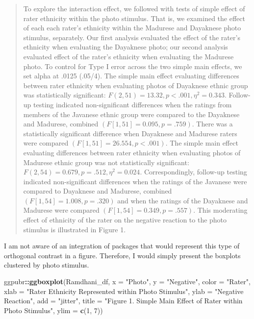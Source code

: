 \documentclass[
  11pt,
]{book}
\newenvironment{Shaded}{\begin{snugshade}}{\end{snugshade}}
\newcommand{\AttributeTok}[1]{\textcolor[rgb]{0.27,0.27,0.27}{#1}}
\newcommand{\DecValTok}[1]{\textcolor[rgb]{0.06,0.06,0.06}{#1}}
\newcommand{\FunctionTok}[1]{\textcolor[rgb]{0.27,0.27,0.27}{\textbf{#1}}}
\newcommand{\NormalTok}[1]{#1}
\newcommand{\SpecialCharTok}[1]{\textcolor[rgb]{0.43,0.43,0.43}{\textbf{#1}}}
\newcommand{\StringTok}[1]{\textcolor[rgb]{0.5,0.5,0.5}{#1}}
\begin{document}
\begin{quote}
To explore the interaction effect, we followed with tests of simple effect of rater ethnicity within the photo stimulus. That is, we examined the effect of each each rater's ethnicity within the Madurese and Dayaknese photo stimulus, separately. Our first analysis evaluated the effect of the rater's ethnicity when evaluating the Dayaknese photo; our second analysis evaluated effect of the rater's ethnicity when evaluating the Madurese photo. To control for Type I error across the two simple main effects, we set alpha at .0125 (.05/4). The simple main effect evaluating differences between rater ethnicity when evaluating photos of Dayaknese ethnic group was statistically significant: \(F(2, 51) = 13.32, p < .001, \eta ^{2} = 0.343\). Follow-up testing indicated non-significant differences when the ratings from members of the Javanese ethnic group were compared to the Dayaknese and Madurese, combined \((F [1, 51] = 0.095, p = .759)\). There was a statistically significant difference when Dayaknese and Madurese raters were compared \((F [1, 51] =26.554, p < .001)\). The simple main effect evaluating differences between rater ethnicity when evaluating photos of Madurese ethnic group was not statistically significant: \(F(2, 54) = 0.679, p = .512, \eta ^{2} = 0.024\). Correspondingly, follow-up testing indicated non-significant differences when the ratings of the Javanese were compared to Dayaknese and Madurese, combined \((F[1, 54] = 1.008, p = .320)\) and when the ratings of the Dayaknese and Madurese were compared \((F[1, 54] = 0.349, p = .557)\). This moderating effect of ethnicity of the rater on the negative reaction to the photo stimulus is illustrated in Figure 1.
\end{quote}

I am not aware of an integration of packages that would represent this type of orthogonal contrast in a figure. Therefore, I would simply present the boxplots clustered by photo stimulus.

\begin{Shaded}
\begin{Highlighting}[]
\NormalTok{ggpubr}\SpecialCharTok{::}\FunctionTok{ggboxplot}\NormalTok{(Ramdhani\_df, }\AttributeTok{x =} \StringTok{"Photo"}\NormalTok{, }\AttributeTok{y =} \StringTok{"Negative"}\NormalTok{, }\AttributeTok{color =} \StringTok{"Rater"}\NormalTok{,}
    \AttributeTok{xlab =} \StringTok{"Rater Ethnicity Represented within Photo Stimulus"}\NormalTok{, }\AttributeTok{ylab =} \StringTok{"Negative Reaction"}\NormalTok{,}
    \AttributeTok{add =} \StringTok{"jitter"}\NormalTok{, }\AttributeTok{title =} \StringTok{"Figure 1. Simple Main Effect of Rater within Photo Stimulus"}\NormalTok{,}
    \AttributeTok{ylim =} \FunctionTok{c}\NormalTok{(}\DecValTok{1}\NormalTok{, }\DecValTok{7}\NormalTok{))}
\end{Highlighting}
\end{Shaded}
\end{document}
